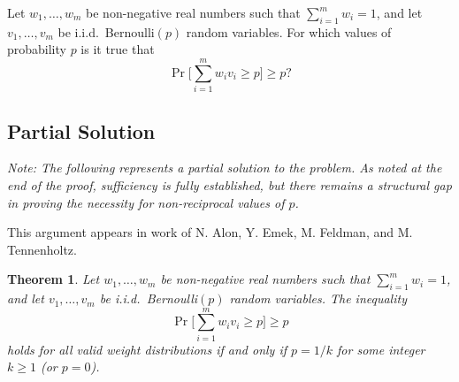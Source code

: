\documentclass[12pt]{article}
\newtheorem{theorem}{Theorem}
\newcommand{\review}[1]{\begin{reviewbox}#1\end{reviewbox}}
\begin{document}
Let $w_1, \ldots, w_m$ be non-negative real numbers such that $\sum_{i=1}^m w_i=1$, and let $v_1, \ldots, v_m$ be i.i.d.\ Bernoulli$(p)$ random variables. For which values of probability $p$ is it true that
\[\Pr\Big[\sum_{i=1}^m w_i v_i\geq p\Big]\geq p?\]

\subsection*{Partial Solution}

\textit{Note: The following represents a partial solution to the problem. As noted at the end of the proof, sufficiency is fully established, but there remains a structural gap in proving the necessity for non-reciprocal values of $p$.}

\review{This argument appears in work of N. Alon, Y. Emek, M. Feldman, and M. Tennenholtz.}
\begin{theorem}
Let $w_1, \ldots, w_m$ be non-negative real numbers such that $\sum_{i=1}^m w_i = 1$, and let $v_1, \ldots, v_m$ be i.i.d.\ Bernoulli$(p)$ random variables. The inequality 
\[\Pr\Big[\sum_{i=1}^m w_i v_i\geq p\Big]\geq p\]
holds for all valid weight distributions if and only if $p = 1/k$ for some integer $k \ge 1$ (or $p=0$).
\end{theorem}
\end{document}
